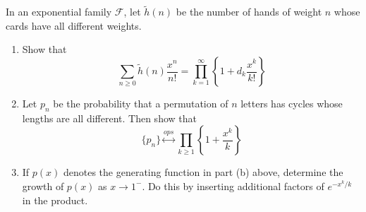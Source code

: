 \begin{exercise}
    In an exponential family $\mathcal{F}$, let $\tilde{h}(n)$ be the number of hands of weight $n$ whose cards have all different weights.
    \begin{enumerate}[label=(\alph*)]
        \item Show that
        \[
            \sum_{n\geq0} \tilde{h}(n) \frac{x^n}{n!} = \prod_{k=1}^\infty \left\{1+d_k\frac{x^k}{k!}\right\}
        \]
        \item Let $p_n$ be the probability that a permutation of $n$ letters has cycles whose lengths are all different. Then show that
        \[
            \{p_n\}\stackrel{ops}{\longleftrightarrow} \prod_{k\geq 1}\left\{1+\frac{x^k}{k}\right\}
        \]
        \item If $p(x)$ denotes the generating function in part (b) above, determine the growth of $p(x)$ as $x\to 1^-$. Do this by inserting additional factors of $e^{-x^k/k}$ in the product.
    \end{enumerate}
\end{exercise}
